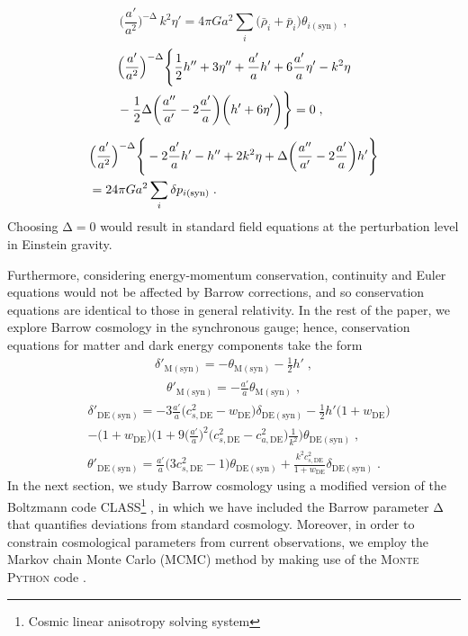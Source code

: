 \documentclass[11pt,twocolumn]{article}
\begin{document}
    \begin{equation} \label{eq37}
    \Big(\frac{a'}{a^2}\Big)^{-\mathrm{\Delta}}\, k^2\eta'=4\pi G a^2 \sum_{i}\big(\bar{\rho}_i+\bar{p}_i\big)\theta_{i(\mathrm{syn})} \;,
    \end{equation}
    \begin{align} \label{eq38}
    &\Big(\frac{a'}{a^2}\Big)^{-\mathrm{\Delta}}\Bigg{\{}\frac{1}{2}h''+3\eta''+\frac{a'}{a}h'+6\frac{a'}{a}\eta'-k^2\eta \nonumber \\ &-\frac{1}{2}\mathrm{\Delta}\bigg(\frac{a''}{a'}-2\frac{a'}{a}\bigg)\bigg(h'+6\eta'\bigg)\Bigg{\}}=0 \;,
    \end{align}
    \begin{align} \label{eq39}
    &\Big(\frac{a'}{a^2}\Big)^{-\mathrm{\Delta}}\Bigg{\{}-2\frac{a'}{a}h'-h''+2k^2\eta+\mathrm{\Delta}\bigg(\frac{a''}{a'}-2\frac{a'}{a}\bigg)h'\Bigg{\}} \nonumber \\
    &=24\pi G a^2 \sum_{i}\delta p_{i(\mathrm{syn})} \;.
    \end{align}
Choosing $\mathrm{\Delta}=0$ would result in standard field equations at
the perturbation level in Einstein gravity.

Furthermore, considering energy-momentum conservation, continuity
and Euler equations would not be affected by Barrow corrections,
and so conservation equations are identical to those in general
relativity. In the rest of the paper, we explore Barrow cosmology
in the synchronous gauge; hence, conservation equations for matter
and dark energy components take the form
    \begin{align}
    \delta'_\mathrm{M(syn)}=-\theta_\mathrm{M(syn)}-\frac{1}{2}h' \;, \label{eq40}
    \end{align}
    \begin{align}
    \theta'_\mathrm{M(syn)}=-\frac{a'}{a}\theta_\mathrm{M(syn)} \;, \label{eq41}
    \end{align}
    \begin{align}
    &\delta'_\mathrm{DE(syn)}=-3\frac{a'}{a}\big(c^2_{s,\mathrm{DE}}-w_\mathrm{DE}\big)\delta_\mathrm{DE(syn)}-\frac{1}{2}h'\big(1+w_\mathrm{DE}\big) \nonumber \\
    &-\big(1+w_\mathrm{DE}\big)\bigg(1+9\Big(\frac{a'}{a}\Big)^2\big(c^2_{s,\mathrm{DE}}-c^2_{a,\mathrm{DE}}\big)\frac{1}{k^2}\bigg)\theta_\mathrm{DE(syn)} \;, \label{eq42}
    \end{align}
    \begin{align}
    \theta'_\mathrm{DE(syn)}=\frac{a'}{a}\big(3c^2_{s,\mathrm{DE}}-1\big)\theta_\mathrm{DE(syn)}+\frac{k^2c^2_{s,\mathrm{DE}}}{1+w_\mathrm{DE}}\delta_\mathrm{DE(syn)} \;. \label{eq43}
    \end{align}
In the next section, we study Barrow cosmology using a modified
version of the Boltzmann code CLASS\footnote{Cosmic linear
anisotropy solving system} \cite{cl1}, in which we have included
the Barrow parameter $\mathrm{\Delta}$ that quantifies deviations from
standard cosmology. Moreover, in order to constrain cosmological
parameters from current observations, we employ the Markov chain
Monte Carlo (MCMC) method by making use of the M\textsc{onte}
P\textsc{ython} code \cite{mp1,mp2}.
\end{document}
